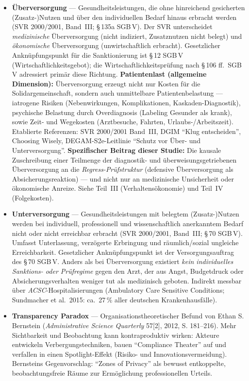 \documentclass{umbruch-position}
\begin{document}
\begin{sloppypar}
\begin{itemize}[leftmargin=1em, itemsep=0.6em]
  \item \textbf{Überversorgung} --- Gesundheitsleistungen, die ohne hinreichend gesicherten (Zusatz-)Nutzen und über den individuellen Bedarf hinaus erbracht werden (SVR 2000/2001, Band~III; \S\,135a SGB\,V). Der SVR unterscheidet \textit{medizinische} Überversorgung (nicht indiziert, Zusatznutzen nicht belegt) und \textit{ökonomische} Überversorgung (unwirtschaftlich erbracht). Gesetzlicher Anknüpfungspunkt für die Sanktionierung ist \S\,12 SGB\,V (Wirtschaftlichkeitsgebot); die Wirtschaftlichkeitsprüfung nach \S\,106 ff.\ SGB\,V adressiert primär diese Richtung. \textbf{Patientenlast (allgemeine Dimension):} Überversorgung erzeugt nicht nur Kosten für die Solidargemeinschaft, sondern auch unmittelbare Patientenbelastung --- iatrogene Risiken (Nebenwirkungen, Komplikationen, Kaskaden-Diagnostik), psychische Belastung durch Overdiagnosis (Labeling Gesunder als krank), sowie Zeit- und Wegekosten (Arztbesuche, Fahrten, Urlaubs-/Arbeitszeit). Etablierte Referenzen: SVR 2000/2001 Band~III, DGIM ``Klug entscheiden'', Choosing Wisely, DEGAM-S2e-Leitlinie ``Schutz vor Über- und Unterversorgung''. \textbf{Spezifischer Beitrag dieser Studie:} Die kausale Zuschreibung einer Teilmenge der diagnostik- und überweisungs\-getriebenen Überversorgung an die \textit{Regress-Prüfstruktur} (defensive Überversorgung als Absicherungs\-reaktion) --- und nicht nur an medizinische Unsicherheit oder ökonomische Anreize. Siehe Teil~III (Verhaltens\-ökonomie) und Teil~IV (Folgekosten).
  \item \textbf{Unterversorgung} --- Gesundheitsleistungen mit belegtem (Zusatz-)Nutzen werden bei individuell, professionell und wissenschaftlich anerkanntem Bedarf nicht oder nicht erreichbar erbracht (SVR 2000/2001, Band~III; \S\,70 SGB\,V). Umfasst Unterlassung, verzögerte Erbringung und räumlich/sozial ungleiche Erreichbarkeit. Gesetzlicher Anknüpfungspunkt ist der Versorgungsauftrag des \S\,70 SGB\,V. Anders als bei Überversorgung existiert \textit{kein individuelles Sanktions- oder Prüfregime} gegen den Arzt, der aus Angst, Budgetdruck oder Absicherungsverhalten weniger tut als medizinisch geboten. Indirekt messbar über \textit{ACSC}-Hospitalisierungen (Ambulatory Care Sensitive Conditions; Sundmacher et al.\ 2015: ca.\ 27\,\% aller deutschen Krankenhausfälle).
  \item \textbf{Transparency Paradox} --- Organisationstheoretischer Befund von Ethan S. Bernstein (\textit{Administrative Science Quarterly} 57[2], 2012, S. 181--216). Mehr Sichtbarkeit und Beobachtung kann kontraproduktiv wirken: Akteure entwickeln Verbergungstechniken, bauen ``Compliance Theater'' auf und verfallen in einen Spotlight-Effekt (Risiko- und Innovationsvermeidung). Bernsteins Gegenvorschlag: ``Zones of Privacy'' als bewusst entkoppelte, beobachtungsfreie Räume zur Ermöglichung professionellen Urteils.

\end{itemize}
\end{sloppypar}
\end{document}
